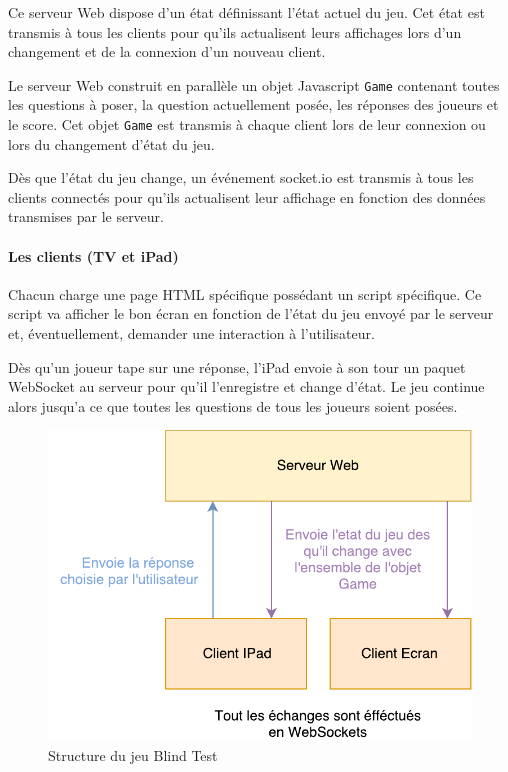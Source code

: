 Ce serveur Web dispose d'un état définissant l'état actuel du jeu.
Cet état est transmis à tous les clients pour qu'ils actualisent leurs affichages lors d'un changement et de la connexion d'un nouveau client.

Le serveur Web construit en parallèle un objet Javascript \texttt{Game} contenant toutes les questions à poser, la question actuellement posée, les réponses des joueurs et le score.
Cet objet \texttt{Game} est transmis à chaque client lors de leur connexion ou lors du changement d'état du jeu.

Dès que l'état du jeu change, un événement socket.io est transmis à tous les clients connectés pour qu'ils actualisent leur affichage en fonction des données transmises par le serveur.

\paragraph{Les clients (TV et iPad)} Chacun charge une page HTML spécifique possédant un script spécifique.
Ce script va afficher le bon écran en fonction de l'état du jeu envoyé par le serveur et, éventuellement, demander une interaction à l'utilisateur.

Dès qu'un joueur tape sur une réponse, l'iPad envoie à son tour un paquet WebSocket au serveur pour qu'il l'enregistre et change d'état.
Le jeu continue alors jusqu'a ce que toutes les questions de tous les joueurs soient posées.

\begin{figure}[h]
    \centering
    \includegraphics{img/ah-blindtest.pdf}
    \caption{Structure du jeu Blind Test}
\end{figure}


